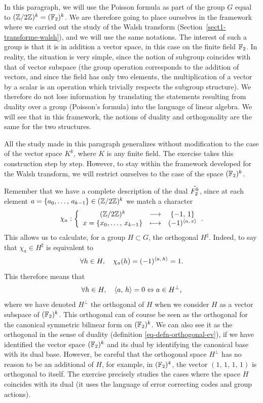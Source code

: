  
In this paragraph, we will use the Poisson formula as part of the group $ G $ equal to $ (\mathbb{Z}/2 \mathbb{Z})^k = (\mathbb{F}_2)^k $. We are therefore going to place ourselves in the framework where we carried out the study of the Walsh transform (Section~\ref{sect1-transforme-walsh}), and we will use the same notations. The interest of such a group is that it is in addition a vector space, in this case on the finite field $ \mathbb{F}_2 $. In reality, the situation is very simple, since the notion of subgroup coincides with that of vector subspace (the group operation corresponds to the addition of vectors, and since the field has only two elements, the multiplication of a vector by a scalar is an operation which trivially respects the subgroup structure). We therefore do not lose information by translating the statements resulting from duality over a group (Poisson's formula) into the language of linear algebra. We will see that in this framework, the notions of duality and orthogonality are the same for the two structures.
 
 
All the study made in this paragraph generalizes without modification to the case of the vector space $ K^k $, where $ K $ is any finite field. The exercise  takes this construction step by step. However, to stay within the framework developed for the Walsh transform, we will restrict ourselves to the case of the space $ (\mathbb{F}_2)^k $.
 
 
Remember that we have a complete description of the dual $ \hat{F_2^k} $, since at each element $ a = \{a_0, \ldots, \, a_{k-1}\} \in ( \mathbb{Z}/2 \mathbb{Z})^k $ we match a character
\begin{equation*}
\chi_a: {\left\{ \begin{array}{ccc} (\mathbb{Z}/2 \mathbb{Z})^k & \longrightarrow & \{- 1, \, 1\} \\ x = \{x_0, \ldots, \, x_{k-1}\} & \longmapsto & (-1)^{\langle a,\,x\rangle} \end{array} \right.}.
\end{equation*}
This allows us to calculate, for a group $ H \subset G $, the orthogonal $ H^{\sharp} $. Indeed, to say that $ \chi_a \in H^{\sharp} $ is equivalent to
\begin{equation*}
\forall h \in H, \quad \chi_a (h) = (-1)^{\langle a,\,h\rangle} = 1.
\end{equation*}
This therefore means that
\begin{equation}
\label{eq-equivalence-orthogonalite-caractere}
\forall h \in H, \quad \langle a,\,h\rangle = 0 \Leftrightarrow a \in H^{\bot},
\end{equation}
where we have denoted $ H^{\bot} $ the orthogonal of $ H $ when we consider $ H $ as a vector subspace of $ (\mathbb{F}_2)^k $. This orthogonal can of course be seen as the orthogonal for the canonical symmetric bilinear form on $ (\mathbb{F}_2)^k $. We can also see it as the orthogonal in the sense of duality (definition \eqref{eq-defn-orthogonal-ev}), if we have identified the vector space $ (\mathbb{F}_2)^k $ and its dual by identifying the canonical base with its dual base. However, be careful that the orthogonal space $ H^\bot $ has no reason to be an additional of $ H $, for example, in $ (\mathbb{F}_2)^4 $, the vector $ ( 1, \, 1, \, 1, \, 1) $ is orthogonal to itself. The exercise  precisely studies the cases where the space $ H $ coincides with its dual (it uses the language of error correcting codes and group actions).
 
